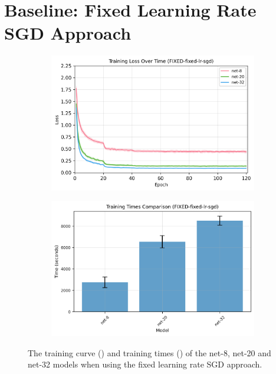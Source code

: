 \documentclass[logo,bsc,singlespacing,parskip,online]{infthesis}
\begin{document}
\section{Baseline: Fixed Learning Rate SGD Approach}
\begin{figure}[h]
   \centering
   \begin{subfigure}[b]{0.45\textwidth}
      \centering
      \includegraphics[width=\textwidth]{FIXED-fixed-lr-sgd_training_losses.png}  
      \caption{}
      \label{fig:fixed-lr-sgd-losses}
   \end{subfigure}
   \begin{subfigure}[b]{0.45\textwidth}
      \centering
      \includegraphics[width=\textwidth]{FIXED-fixed-lr-sgd_training_times.png}
      \caption{}
      \label{fig:fixed-lr-sgd-times}
   \end{subfigure}
   \caption{The training curve () and training times () of the net-8, net-20 and net-32 models when using the fixed learning rate SGD approach.}
   \label{fig:training-curves}
\end{figure}
\end{document}
